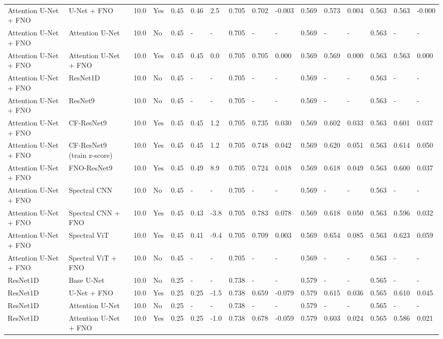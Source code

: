 \begin{longtable}{llllllllllllllll}
Attention U-Net + FNO & U-Net + FNO & 10.0 & Yes & 0.45 & 0.46 & 2.5 & 0.705 & 0.702 & -0.003 & 0.569 & 0.573 & 0.004 & 0.563 & 0.563 & -0.000 \\
Attention U-Net + FNO & Attention U-Net & 10.0 & No & 0.45 & - & - & 0.705 & - & - & 0.569 & - & - & 0.563 & - & - \\
Attention U-Net + FNO & Attention U-Net + FNO & 10.0 & Yes & 0.45 & 0.45 & 0.0 & 0.705 & 0.705 & 0.000 & 0.569 & 0.569 & 0.000 & 0.563 & 0.563 & 0.000 \\
Attention U-Net + FNO & ResNet1D & 10.0 & No & 0.45 & - & - & 0.705 & - & - & 0.569 & - & - & 0.563 & - & - \\
Attention U-Net + FNO & ResNet9 & 10.0 & No & 0.45 & - & - & 0.705 & - & - & 0.569 & - & - & 0.563 & - & - \\
Attention U-Net + FNO & CF-ResNet9 & 10.0 & Yes & 0.45 & 0.45 & 1.2 & 0.705 & 0.735 & 0.030 & 0.569 & 0.602 & 0.033 & 0.563 & 0.601 & 0.037 \\
Attention U-Net + FNO & CF-ResNet9 (train z-score) & 10.0 & Yes & 0.45 & 0.45 & 1.2 & 0.705 & 0.748 & 0.042 & 0.569 & 0.620 & 0.051 & 0.563 & 0.614 & 0.050 \\
Attention U-Net + FNO & FNO-ResNet9 & 10.0 & Yes & 0.45 & 0.49 & 8.9 & 0.705 & 0.724 & 0.018 & 0.569 & 0.618 & 0.049 & 0.563 & 0.600 & 0.037 \\
Attention U-Net + FNO & Spectral CNN & 10.0 & No & 0.45 & - & - & 0.705 & - & - & 0.569 & - & - & 0.563 & - & - \\
Attention U-Net + FNO & Spectral CNN + FNO & 10.0 & Yes & 0.45 & 0.43 & -3.8 & 0.705 & 0.783 & 0.078 & 0.569 & 0.618 & 0.050 & 0.563 & 0.596 & 0.032 \\
Attention U-Net + FNO & Spectral ViT & 10.0 & Yes & 0.45 & 0.41 & -9.4 & 0.705 & 0.709 & 0.003 & 0.569 & 0.654 & 0.085 & 0.563 & 0.623 & 0.059 \\
Attention U-Net + FNO & Spectral ViT + FNO & 10.0 & No & 0.45 & - & - & 0.705 & - & - & 0.569 & - & - & 0.563 & - & - \\
ResNet1D & Base U-Net & 10.0 & No & 0.25 & - & - & 0.738 & - & - & 0.579 & - & - & 0.565 & - & - \\
ResNet1D & U-Net + FNO & 10.0 & Yes & 0.25 & 0.25 & -1.5 & 0.738 & 0.659 & -0.079 & 0.579 & 0.615 & 0.036 & 0.565 & 0.610 & 0.045 \\
ResNet1D & Attention U-Net & 10.0 & No & 0.25 & - & - & 0.738 & - & - & 0.579 & - & - & 0.565 & - & - \\
ResNet1D & Attention U-Net + FNO & 10.0 & Yes & 0.25 & 0.25 & -1.0 & 0.738 & 0.678 & -0.059 & 0.579 & 0.603 & 0.024 & 0.565 & 0.586 & 0.021 \\

\end{longtable}
